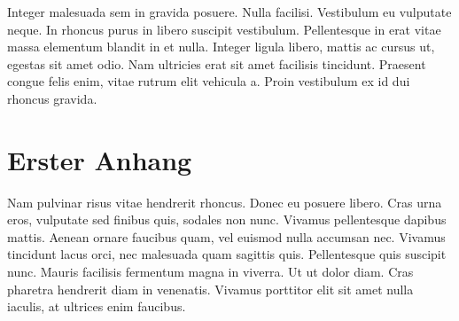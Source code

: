\documentclass[12pt,a4paper,parskip=half]{scrartcl}
\begin{document}
Integer malesuada sem in gravida posuere. Nulla facilisi. Vestibulum eu vulputate neque. In rhoncus purus in libero suscipit vestibulum. Pellentesque in erat vitae massa elementum blandit in et nulla. Integer ligula libero, mattis ac cursus ut, egestas sit amet odio. Nam ultricies erat sit amet facilisis tincidunt. Praesent congue felis enim, vitae rutrum elit vehicula a. Proin vestibulum ex id dui rhoncus gravida.

\makeworkscited

\appendix

\section{Erster Anhang}

Nam pulvinar risus vitae hendrerit rhoncus. Donec eu posuere libero. Cras urna eros, vulputate sed finibus quis, sodales non nunc. Vivamus pellentesque dapibus mattis. Aenean ornare faucibus quam, vel euismod nulla accumsan nec. Vivamus tincidunt lacus orci, nec malesuada quam sagittis quis. Pellentesque quis suscipit nunc. Mauris facilisis fermentum magna in viverra. Ut ut dolor diam. Cras pharetra hendrerit diam in venenatis. Vivamus porttitor elit sit amet nulla iaculis, at ultrices enim faucibus.
\end{document}
